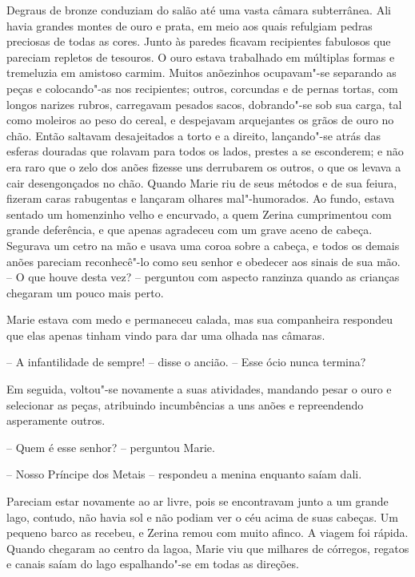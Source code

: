 Degraus de bronze conduziam do salão até uma vasta câmara subterrânea.
Ali havia grandes montes de ouro e prata, em meio aos quais refulgiam
pedras preciosas de todas as cores. Junto às paredes ficavam
recipientes fabulosos que pareciam repletos de tesouros. O ouro estava
trabalhado em múltiplas formas e tremeluzia em amistoso carmim. 
Muitos anõezinhos ocupavam"-se separando as peças e
colocando"-as nos recipientes; outros, corcundas e de pernas tortas, com
longos narizes rubros, carregavam pesados sacos, dobrando"-se sob sua
carga, tal como moleiros ao peso do cereal, e despejavam arquejantes os
grãos de ouro no chão. Então saltavam desajeitados a torto e a direito,
lançando"-se atrás das esferas douradas que rolavam para todos os lados,
prestes a se esconderem; e não era raro que o zelo dos anões fizesse
uns derrubarem os outros, o que os levava a cair desengonçados no chão. 
Quando Marie riu de seus métodos e de sua feiura, fizeram caras rabugentas 
e lançaram olhares mal"-humorados. Ao fundo, estava sentado um
homenzinho velho e encurvado, a quem Zerina cumprimentou com grande
deferência, e que apenas agradeceu com um grave aceno de cabeça.
Segurava um cetro na mão e usava uma coroa sobre a cabeça, e todos os
demais anões pareciam reconhecê"-lo como seu senhor e obedecer aos
sinais de sua mão.
\pagebreak
-- O que houve desta vez? -- perguntou com aspecto ranzinza
quando as crianças chegaram um pouco mais perto. 

Marie estava com medo e permaneceu calada, mas sua companheira respondeu
que elas apenas tinham vindo para dar uma olhada nas câmaras.

-- A infantilidade de sempre! -- disse o ancião. -- Esse ócio nunca
termina?

Em seguida, voltou"-se novamente a suas atividades, mandando pesar o
ouro e selecionar as peças, \mbox{atribuindo} incumbências a uns anões e
repreendendo asperamente outros.

-- Quem é esse senhor? -- perguntou Marie.

-- Nosso Príncipe dos Metais -- respondeu a menina enquanto saíam dali.

Pareciam estar novamente ao ar livre, pois se encontravam junto a um
grande lago, contudo, não havia sol e não podiam ver o céu acima de
suas cabeças. Um pequeno barco as recebeu, e Zerina remou com muito
afinco. A viagem foi rápida. Quando chegaram ao centro da lagoa, Marie
viu que milhares de córregos, regatos e canais saíam do lago
espalhando"-se em todas as direções.


